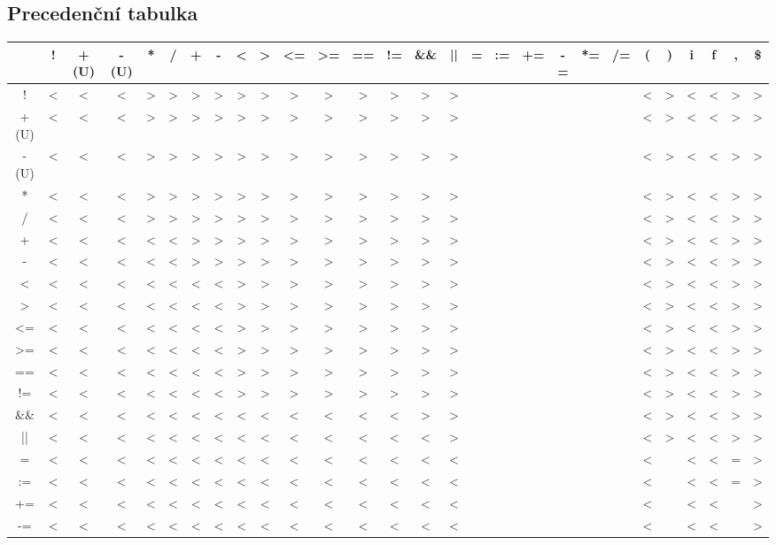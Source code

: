 \documentclass[11pt]{article}
\begin{document}
\begin{landscape}
\thispagestyle{empty}

\subsection{Precedenční tabulka}
\begin{tabular}{ |c||c|c|c|c|c|c|c|c|c|c|c|c|c|c|c|c|c|c|c|c|c|c|c|c|c|c|c| } \hline
     & ! & + (U) & - (U) & * & / & + & - & < & > & <= & >= & == & != & \&\& & || & = & := & += & -= & *= & /= & ( & ) & i & f & , & \$ \\ \hline \hline
     ! &<&<&<&>&>&>&>&>&>&>&>&>&>&>&>&&&&&&&<&>&<&<&>&> \\ \hline
     + (U) &<&<&<&>&>&>&>&>&>&>&>&>&>&>&>&&&&&&&<&>&<&<&>&> \\ \hline
     - (U) &<&<&<&>&>&>&>&>&>&>&>&>&>&>&>&&&&&&&<&>&<&<&>&> \\ \hline
     * &<&<&<&>&>&>&>&>&>&>&>&>&>&>&>&&&&&&&<&>&<&<&>&> \\ \hline
     / &<&<&<&>&>&>&>&>&>&>&>&>&>&>&>&&&&&&&<&>&<&<&>&> \\ \hline
     + &<&<&<&<&<&>&>&>&>&>&>&>&>&>&>&&&&&&&<&>&<&<&>&> \\ \hline
     - &<&<&<&<&<&>&>&>&>&>&>&>&>&>&>&&&&&&&<&>&<&<&>&> \\ \hline
     < &<&<&<&<&<&<&<&>&>&>&>&>&>&>&>&&&&&&&<&>&<&<&>&> \\ \hline
     > &<&<&<&<&<&<&<&>&>&>&>&>&>&>&>&&&&&&&<&>&<&<&>&> \\ \hline
     <= &<&<&<&<&<&<&<&>&>&>&>&>&>&>&>&&&&&&&<&>&<&<&>&> \\ \hline
     >= &<&<&<&<&<&<&<&>&>&>&>&>&>&>&>&&&&&&&<&>&<&<&>&> \\ \hline
     == &<&<&<&<&<&<&<&>&>&>&>&>&>&>&>&&&&&&&<&>&<&<&>&> \\ \hline
     != &<&<&<&<&<&<&<&>&>&>&>&>&>&>&>&&&&&&&<&>&<&<&>&> \\ \hline
     \&\& &<&<&<&<&<&<&<&<&<&<&<&<&<&>&>&&&&&&&<&>&<&<&>&> \\ \hline
    || &<&<&<&<&<&<&<&<&<&<&<&<&<&<&>&&&&&&&<&>&<&<&>&> \\ \hline
     = &<&<&<&<&<&<&<&<&<&<&<&<&<&<&<&&&&&&&<&&<&<&=&> \\ \hline
    := &<&<&<&<&<&<&<&<&<&<&<&<&<&<&<&&&&&&&<&&<&<&=&> \\ \hline
    += &<&<&<&<&<&<&<&<&<&<&<&<&<&<&<&&&&&&&<&&<&<&&> \\ \hline
    -= &<&<&<&<&<&<&<&<&<&<&<&<&<&<&<&&&&&&&<&&<&<&&> \\ \hline

\end{tabular}
\end{landscape}
\end{document}
